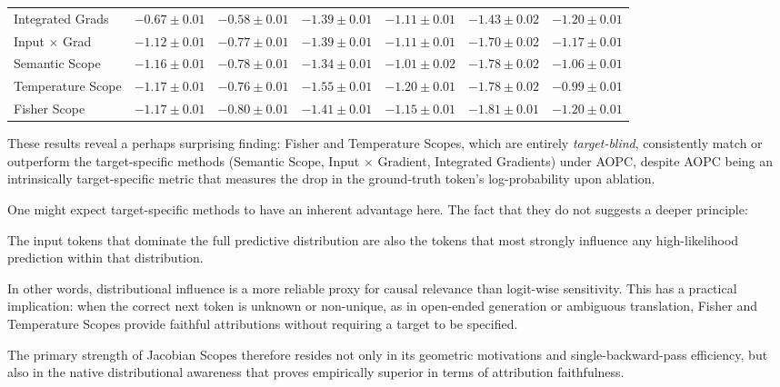 \documentclass{article}
\begin{document}
\begin{table}[h]
{\begin{tabular}{lcccccc}
  Integrated Grads    & $-0.67 \pm 0.01$ & $-0.58 \pm 0.01$ & $-1.39 \pm 0.01$ & $-1.11 \pm 0.01$ & $-1.43 \pm 0.02$ & $\mathbf{-1.20 \pm 0.01}$ \\
  Input $\times$ Grad & $-1.12 \pm 0.01$ & $-0.77 \pm 0.01$ & $-1.39 \pm 0.01$ & $-1.11 \pm 0.01$ & $-1.70 \pm 0.02$ & $-1.17 \pm 0.01$ \\
  \hline
  Semantic Scope      & $-1.16 \pm 0.01$ & $-0.78 \pm 0.01$ & $-1.34 \pm 0.01$ & $-1.01 \pm 0.02$ & $-1.78 \pm 0.02$ & $-1.06 \pm 0.01$ \\
  Temperature Scope   & $\mathbf{-1.17 \pm 0.01}$ & $-0.76 \pm 0.01$ & $\mathbf{-1.55 \pm 0.01}$ & $\mathbf{-1.20 \pm 0.01}$ & $-1.78 \pm 0.02$ & $-0.99 \pm 0.01$ \\
  Fisher Scope        & $\mathbf{-1.17 \pm 0.01}$ & $\mathbf{-0.80 \pm 0.01}$ & $-1.41 \pm 0.01$ & $-1.15 \pm 0.01$ & $\mathbf{-1.81 \pm 0.01}$ & $\mathbf{-1.20 \pm 0.01}$ \\
  \hline  
  \end{tabular}}
  \label{tab:aupc}
\end{table}

These results reveal a perhaps surprising finding: Fisher and Temperature Scopes, which are entirely \emph{target-blind}, consistently match or outperform the target-specific methods (Semantic Scope, Input $\times$ Gradient, Integrated Gradients) under AOPC, despite AOPC being an intrinsically target-specific metric that measures the drop in the ground-truth token's log-probability upon ablation.

One might expect target-specific methods to have an inherent advantage here.
The fact that they do not suggests a deeper principle: 
\begin{tcolorbox}[colback=gray!10, colframe=gray!50]
The input tokens that dominate the full predictive distribution are also the tokens that most strongly influence any high-likelihood prediction within that distribution.
\end{tcolorbox}
In other words, distributional influence is a more reliable proxy for causal relevance than logit-wise sensitivity.
This has a practical implication: when the correct next token is unknown or non-unique, as in open-ended generation or ambiguous translation, Fisher and Temperature Scopes provide faithful attributions without requiring a target to be specified.

The primary strength of Jacobian Scopes therefore resides not only in its geometric motivations and single-backward-pass efficiency, but also in the native distributional awareness that proves empirically superior in terms of attribution faithfulness.
\end{document}
